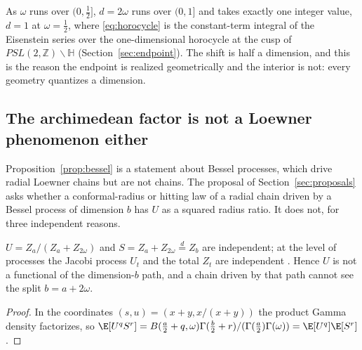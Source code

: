 \begin{remark}\label{rem:integer}
As $\omega$ runs over $(0,\frac12]$, $d=2\omega$ runs over $(0,1]$ and takes
exactly one integer value, $d=1$ at $\omega=\frac12$, where \eqref{eq:horocycle}
is the constant-term integral of the Eisenstein series over the one-dimensional
horocycle at the cusp of $PSL(2,\mathbb Z)\backslash\mathbb H$
(Section~\ref{sec:endpoint}). The shift is half a dimension, and this is the
reason the endpoint is realized geometrically and the interior is not: every
geometry quantizes a dimension.
\end{remark}

\subsection{The archimedean factor is not a Loewner phenomenon either}\label{sec:nobeta}

Proposition~\ref{prop:bessel} is a statement about Bessel processes, which drive
radial Loewner chains but are not chains. The proposal of
Section~\ref{sec:proposals} asks whether a conformal-radius or hitting law of a
radial chain driven by a Bessel process of dimension $b$ has $U$ as a squared
radius ratio. It does not, for three independent reasons.

\begin{proposition}\label{prop:indep}
$U=Z_a/(Z_a+Z_{2\omega})$ and $S=Z_a+Z_{2\omega}\stackrel d=Z_b$ are independent;
at the level of processes the Jacobi process $U_t$ and the total $Z_t$ are
independent \cite{WarrenYor}. Hence $U$ is not a functional of the dimension-$b$
path, and a chain driven by that path cannot see the split $b=a+2\omega$.
\end{proposition}
\begin{proof}
In the coordinates $(s,u)=(x+y,x/(x+y))$ the product Gamma density factorizes, so
$\E[U^qS^r]=B(\frac a2+q,\omega)\Gamma(\frac b2+r)/(\Gamma(\frac a2)\Gamma(\omega))=\E[U^q]\E[S^r]$.
\end{proof}

